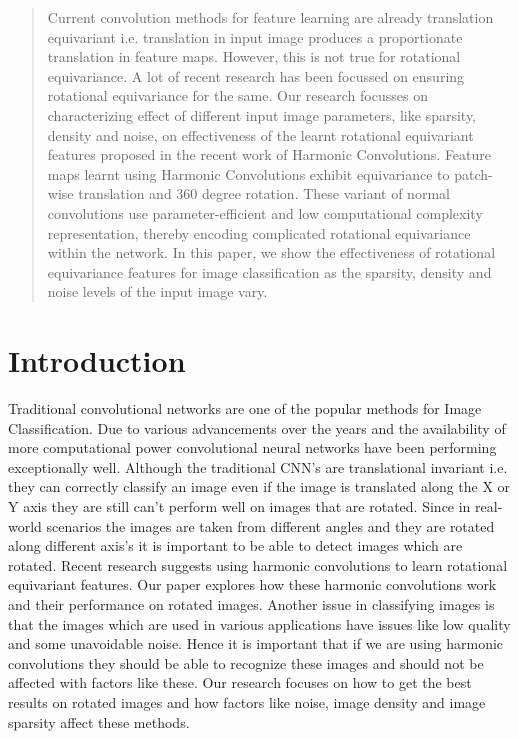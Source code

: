 \documentclass{article}
\begin{document}





\begin{abstract} 
Current convolution methods for feature learning are already translation equivariant i.e. translation in input image produces a proportionate translation in feature maps. However, this is not true for rotational equivariance. A lot of recent research has been focussed on ensuring rotational equivariance for the same. Our research focusses on characterizing effect of different input image parameters, like sparsity, density and noise, on effectiveness of the learnt rotational equivariant features proposed in the recent work of Harmonic Convolutions. Feature maps learnt using Harmonic Convolutions exhibit equivariance to patch-wise translation and 360 degree rotation. These variant of normal convolutions use parameter-efficient and low computational complexity representation, thereby encoding complicated rotational equivariance within the network. In this paper, we show the effectiveness of rotational equivariance features for image classification as the sparsity, density and noise levels of the input image vary.

\end{abstract} 

\section{Introduction}
Traditional convolutional networks are one of the popular methods for Image Classification. Due to various advancements over the years and the availability of more computational power convolutional neural networks have been performing exceptionally well. Although the traditional CNN’s are translational invariant i.e. they can correctly classify an image even if the image is translated along the X or Y axis they are still can’t perform well on images that are rotated. Since in real-world scenarios the images are taken from different angles and they are rotated along different axis’s it is important to be able to detect images which are rotated. Recent research suggests using harmonic convolutions to learn rotational equivariant features. Our paper explores how these harmonic convolutions work and their performance on rotated images. Another issue in classifying images is that the images which are used in various applications have issues like low quality and some unavoidable noise. Hence it is important that if we are using harmonic convolutions they should be able to recognize these images and should not be affected with factors like these. Our research focuses on how to get the best results on rotated images and how factors like noise, image density and image sparsity affect these methods.
\end{document}
